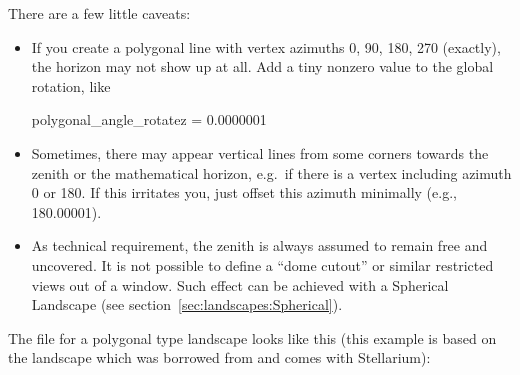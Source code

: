 There are a few little caveats:
\begin{itemize}
\item If you create a polygonal line with vertex azimuths 0, 90, 180, 270 (exactly), 
the horizon may not show up at all. Add a tiny nonzero value to the global rotation, like 
\begin{configfile}
polygonal_angle_rotatez = 0.0000001
\end{configfile}
\item Sometimes, there may appear vertical lines
from some corners towards the zenith or the mathematical horizon,
e.g.\ if there is a vertex including azimuth 0 or 180. If this
irritates you, just offset this azimuth minimally (e.g., 180.00001).
\item As technical requirement, the zenith is always assumed to remain
  free and uncovered. It is not possible to define a ``dome cutout''
  or similar restricted views out of a window. Such effect can be
  achieved with a Spherical Landscape (see
  section~\ref{sec:landscapes:Spherical}).
\end{itemize}

\noindent The  file for a polygonal type landscape looks
like this (this example is based on the  landscape
which was borrowed from  and comes with Stellarium):

